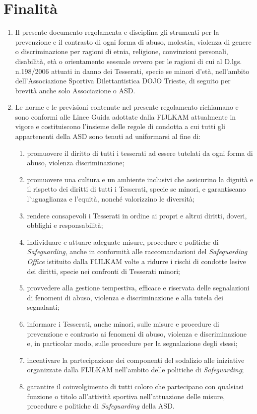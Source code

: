 \documentclass{djtsdoc}
\begin{document}
	\section{Finalità}
	\begin{enumerate}
		\item Il presente documento regolamenta e disciplina gli strumenti per la prevenzione e il contrasto di ogni forma di abuso, molestia, violenza di genere o discriminazione per ragioni di etnia, religione, convinzioni personali, disabilità, età o orientamento sessuale ovvero per le ragioni di cui al D.lgs. n.198/2006 attuati in danno dei Tesserati, specie se minori d'età, nell'ambito dell'Associazione Sportiva Dilettantistica DOJO Trieste, di seguito per brevità anche solo Associazione o ASD.
		\item Le norme e le previsioni contenute nel presente regolamento richiamano e sono conformi alle Linee Guida adottate dalla FIJLKAM attualmente in vigore e costituiscono l'insieme delle regole di condotta a cui tutti gli appartenenti della ASD sono tenuti ad uniformarsi al fine di:
		\begin{enumerate}
			\item promuovere il diritto di tutti i tesserati ad essere tutelati da ogni forma di abuso, violenza discriminazione;
			\item promuovere una cultura e un ambiente inclusivi che assicurino la dignità e il rispetto dei diritti di tutti i Tesserati, specie se minori, e garantiscano l'uguaglianza e l'equità, nonché valorizzino le diversità;
			\item rendere consapevoli i Tesserati in ordine ai propri e altrui diritti, doveri, obblighi e responsabilità;
			\item individuare e attuare adeguate misure, procedure e politiche di \textit{Safeguarding}, anche in conformità alle raccomandazioni del \textit{Safeguarding Office} istituito dalla FIJLKAM volte a ridurre i rischi di condotte lesive dei diritti, specie nei confronti di Tesserati minori;
			\item provvedere alla gestione tempestiva, efficace e riservata delle segnalazioni di fenomeni di abuso, violenza e discriminazione e alla tutela dei segnalanti;
			\item informare i Tesserati, anche minori, sulle misure e procedure di prevenzione e contrasto ai fenomeni di abuso, violenza e discriminazione e, in particolar modo, sulle procedure per la segnalazione degli stessi;
			\item incentivare la partecipazione dei componenti del sodalizio alle iniziative organizzate dalla FIJLKAM nell'ambito delle politiche di \textit{Safeguarding};
			\item garantire il coinvolgimento di tutti coloro che partecipano con qualsiasi funzione o titolo all'attività sportiva nell'attuazione delle misure, procedure e politiche di \textit{Safeguarding} della ASD.
		\end{enumerate}
	\end{enumerate}
	
\end{document}
